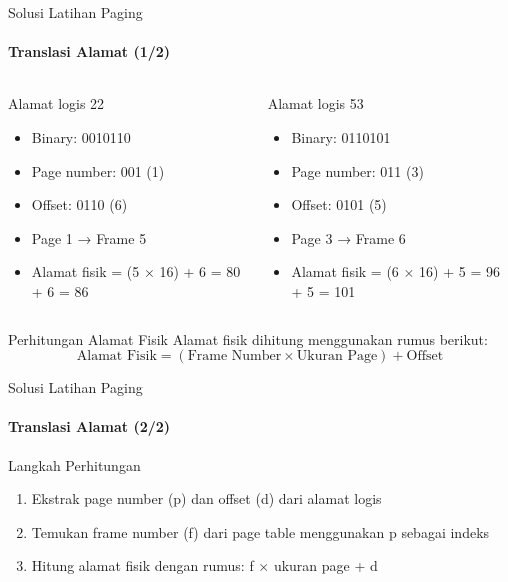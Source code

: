 \documentclass[10pt,aspectratio=169]{beamer}
\begin{document}
\begin{frame}{Solusi Latihan Paging}
    \framesubtitle{Translasi Alamat (1/2)}
    
    \begin{columns}[T]
            \begin{block}{Alamat logis 22}
                \begin{itemize}
                    \item Binary: 0010110
                    \item Page number: 001 (1)
                    \item Offset: 0110 (6)
                    \item Page 1 → Frame 5
                    \item Alamat fisik = (5 $\times$ 16) + 6 = 80 + 6 = 86
                \end{itemize}
            \end{block}
            
            \begin{block}{Alamat logis 53}
                \begin{itemize}
                    \item Binary: 0110101
                    \item Page number: 011 (3)
                    \item Offset: 0101 (5)
                    \item Page 3 → Frame 6
                    \item Alamat fisik = (6 $\times$ 16) + 5 = 96 + 5 = 101
                \end{itemize}
            \end{block}
    \end{columns}

    \begin{block}{Perhitungan Alamat Fisik}
        Alamat fisik dihitung menggunakan rumus berikut:
        \[ \text{Alamat Fisik} = (\text{Frame Number} \times \text{Ukuran Page}) + \text{Offset} \]
    \end{block}
\end{frame}

\begin{frame}{Solusi Latihan Paging}
    \framesubtitle{Translasi Alamat (2/2)}
    
    \begin{block}{Langkah Perhitungan}
        \begin{enumerate}
            \item Ekstrak page number (p) dan offset (d) dari alamat logis
            \item Temukan frame number (f) dari page table menggunakan p sebagai indeks
            \item Hitung alamat fisik dengan rumus: f × ukuran page + d
        \end{enumerate}
    \end{block}
\end{frame}
\end{document}

